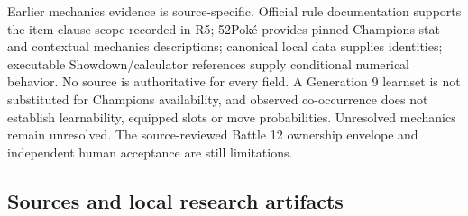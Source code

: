 \documentclass[10pt,a4paper]{article}
\begin{document}
Earlier mechanics evidence is source-specific. Official rule documentation supports the item-clause scope recorded in R5; 52Pok\'e provides pinned Champions stat and contextual mechanics descriptions; canonical local data supplies identities; executable Showdown/calculator references supply conditional numerical behavior. No source is authoritative for every field. A Generation 9 learnset is not substituted for Champions availability, and observed co-occurrence does not establish learnability, equipped slots or move probabilities. Unresolved mechanics remain unresolved. The source-reviewed Battle 12 ownership envelope and independent human acceptance are still limitations.

\subsection*{Sources and local research artifacts}
\end{document}
